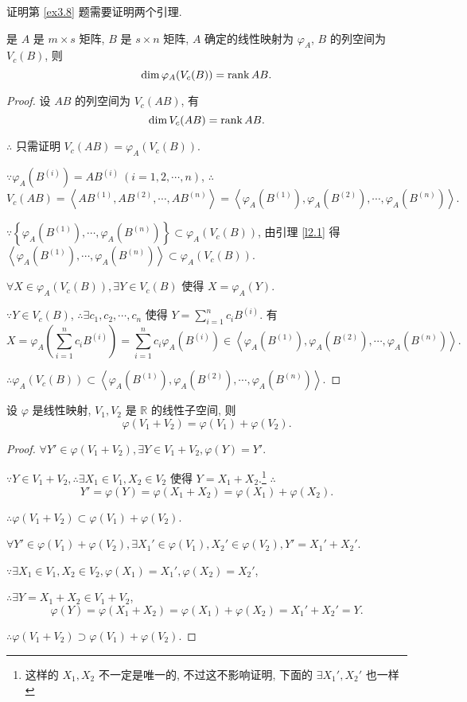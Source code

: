 \documentclass{ctexart}
\begin{document}
证明第 \ref{ex3.8} 题需要证明两个引理.
\begin{lemma}\label{l2.3}
    是 $A$ 是 $m\times s$ 矩阵, $B$ 是 $s\times n$ 矩阵, $A$ 确定的线性映射为 $\varphi_A$, $B$ 的列空间为 $V_c(B)$, 则
    \[\dim\varphi_A(V_c(B))=\operatorname{rank} AB.\]
\end{lemma}
\begin{proof}
    设 $AB$ 的列空间为 $V_c(AB)$, 有
    \[\dim V_c(AB)=\operatorname{rank} AB.\]

    $\therefore$ 只需证明 $V_c(AB)=\varphi_A(V_c(B))$.

    $\because\varphi_A(B^{(i)})=AB^{(i)}\ (i=1,2,\cdots,n)$, $\therefore$
    \[V_c(AB)=\left<AB^{(1)},AB^{(2)},\cdots,AB^{(n)}\right>=\left<\varphi_A(B^{(1)}),\varphi_A(B^{(2)}),\cdots,\varphi_A(B^{(n)})\right>.\]

    $\because\left\{\varphi_A(B^{(1)}),\cdots,\varphi_A(B^{(n)})\right\}\subset\varphi_A(V_c(B))$, 由引理 \ref{l2.1} 得 $\left<\varphi_A(B^{(1)}),\cdots,\varphi_A(B^{(n)})\right>\subset\varphi_A(V_c(B))$.

    $\forall X\in\varphi_A(V_c(B)),\exists Y\in V_c(B)$ 使得 $X=\varphi_A(Y)$.
    
    $\because Y\in V_c(B)$, $\therefore\exists c_1,c_2,\cdots,c_n$ 使得 $Y=\sum\limits_{i=1}^nc_iB^{(i)}$. 有
    \[X=\varphi_A\left(\sum\limits_{i=1}^nc_iB^{(i)}\right)=\sum\limits_{i=1}^nc_i\varphi_A(B^{(i)})\in\left<\varphi_A(B^{(1)}),\varphi_A(B^{(2)}),\cdots,\varphi_A(B^{(n)})\right>.\]

    $\therefore\varphi_A(V_c(B))\subset\left<\varphi_A(B^{(1)}),\varphi_A(B^{(2)}),\cdots,\varphi_A(B^{(n)})\right>$.
\end{proof}
\begin{lemma}\label{l2.4}
    设 $\varphi$ 是线性映射, $V_1,V_2$ 是 $\mathbb{R}$ 的线性子空间, 则
    \[\varphi(V_1+V_2)=\varphi(V_1)+\varphi(V_2).\]
\end{lemma}
\begin{proof}
    $\forall Y'\in\varphi(V_1+V_2),\exists Y\in V_1+V_2,\varphi(Y)=Y'$.

    $\because Y\in V_1+V_2,\therefore\exists X_1\in V_1,X_2\in V_2$ 使得 $Y=X_1+X_2$.\footnote{这样的 $X_1,X_2$ 不一定是唯一的, 不过这不影响证明, 下面的 $\exists X_1',X_2'$ 也一样} $\therefore$
    \[Y'=\varphi(Y)=\varphi(X_1+X_2)=\varphi(X_1)+\varphi(X_2).\]

    $\therefore\varphi(V_1+V_2)\subset\varphi(V_1)+\varphi(V_2)$.

    $\forall Y'\in\varphi(V_1)+\varphi(V_2),\exists X_1'\in\varphi(V_1),X_2'\in\varphi(V_2),Y'=X_1'+X_2'$.

    $\because\exists X_1\in V_1,X_2\in V_2,\varphi(X_1)=X_1',\varphi(X_2)=X_2'$,

    $\therefore\exists Y=X_1+X_2\in V_1+V_2$,
    \[\varphi(Y)=\varphi(X_1+X_2)=\varphi(X_1)+\varphi(X_2)=X_1'+X_2'=Y.\]

    $\therefore\varphi(V_1+V_2)\supset\varphi(V_1)+\varphi(V_2)$.
\end{proof}
\end{document}
